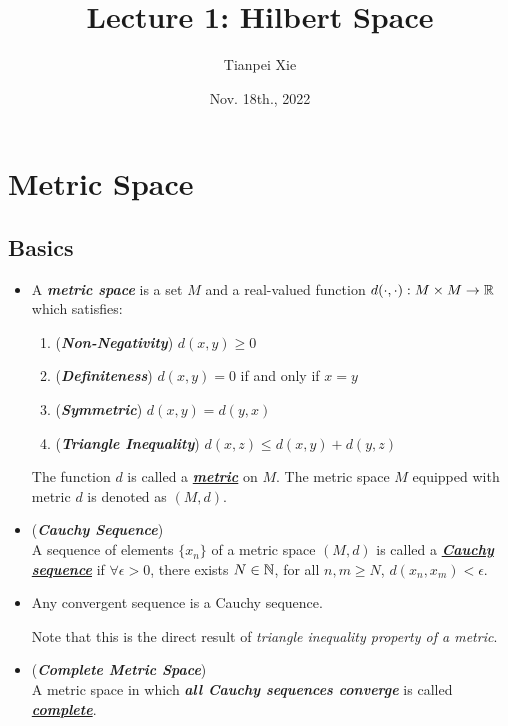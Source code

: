 \documentclass[11pt]{article}
\begin{document}
\title{Lecture 1: Hilbert Space}
\author{ Tianpei Xie}
\date{ Nov. 18th., 2022 }
\maketitle
\tableofcontents
\newpage
\section{Metric Space}
\subsection{Basics}
\begin{itemize}
\item \begin{definition}
A \emph{\textbf{metric space}} is a set $M$ and a real-valued function $d(\cdot , \cdot): M \times M \rightarrow {\mathbb R}$  which satisfies:
\begin{enumerate}
\item (\emph{\textbf{Non-Negativity}}) $d(x, y) \ge 0$
\item (\emph{\textbf{Definiteness}}) $d(x, y) = 0$ if and only if $x = y$
\item (\emph{\textbf{Symmetric}}) $d(x, y) = d(y, x)$
\item (\emph{\textbf{Triangle Inequality}}) $d(x, z) \le d(x, y) + d(y, z)$
\end{enumerate} The function $d$ is called a \underline{\emph{\textbf{metric}}} on $M$. The metric space $M$ equipped with metric $d$ is denoted as $(M, d)$.
\end{definition}

\item \begin{definition} (\emph{\textbf{Cauchy Sequence}})\\
A sequence of elements $\{x_n\}$ of a metric space $(M, d)$ is called a \underline{\emph{\textbf{Cauchy sequence}}} if $\forall \epsilon >0$, there exists $N \in {\mathbb N}$, for all $n, m \ge N$, $d(x_n, x_m ) < \epsilon$.
\end{definition}

\item \begin{proposition}
Any convergent sequence is a Cauchy sequence.
\end{proposition} Note that this is the direct result of \emph{triangle inequality property of a metric}.

\item \begin{definition}  (\emph{\textbf{Complete Metric Space}})\\
A metric space in which \emph{\textbf{all Cauchy sequences converge}} is called \underline{\emph{\textbf{complete}}}.
\end{definition}


\end{itemize}
\end{document}
